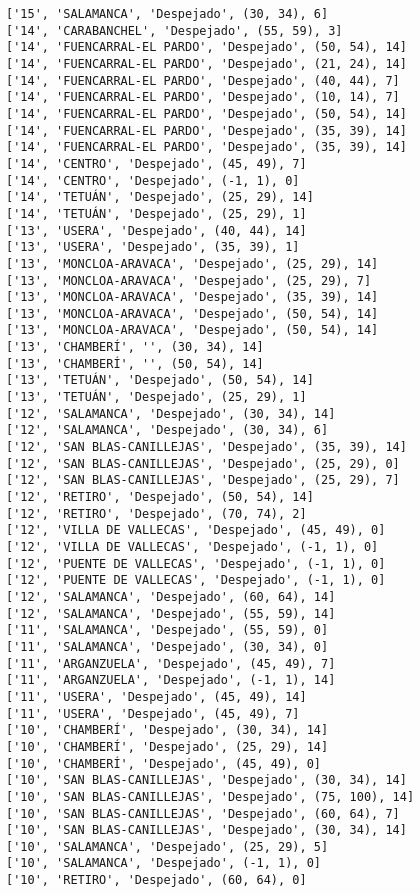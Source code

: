 \documentclass[11pt]{article}
\begin{document}
\begin{Verbatim}[commandchars=\\\{\}]
['15', 'SALAMANCA', 'Despejado', (30, 34), 6]
['14', 'CARABANCHEL', 'Despejado', (55, 59), 3]
['14', 'FUENCARRAL-EL PARDO', 'Despejado', (50, 54), 14]
['14', 'FUENCARRAL-EL PARDO', 'Despejado', (21, 24), 14]
['14', 'FUENCARRAL-EL PARDO', 'Despejado', (40, 44), 7]
['14', 'FUENCARRAL-EL PARDO', 'Despejado', (10, 14), 7]
['14', 'FUENCARRAL-EL PARDO', 'Despejado', (50, 54), 14]
['14', 'FUENCARRAL-EL PARDO', 'Despejado', (35, 39), 14]
['14', 'FUENCARRAL-EL PARDO', 'Despejado', (35, 39), 14]
['14', 'CENTRO', 'Despejado', (45, 49), 7]
['14', 'CENTRO', 'Despejado', (-1, 1), 0]
['14', 'TETUÁN', 'Despejado', (25, 29), 14]
['14', 'TETUÁN', 'Despejado', (25, 29), 1]
['13', 'USERA', 'Despejado', (40, 44), 14]
['13', 'USERA', 'Despejado', (35, 39), 1]
['13', 'MONCLOA-ARAVACA', 'Despejado', (25, 29), 14]
['13', 'MONCLOA-ARAVACA', 'Despejado', (25, 29), 7]
['13', 'MONCLOA-ARAVACA', 'Despejado', (35, 39), 14]
['13', 'MONCLOA-ARAVACA', 'Despejado', (50, 54), 14]
['13', 'MONCLOA-ARAVACA', 'Despejado', (50, 54), 14]
['13', 'CHAMBERÍ', '', (30, 34), 14]
['13', 'CHAMBERÍ', '', (50, 54), 14]
['13', 'TETUÁN', 'Despejado', (50, 54), 14]
['13', 'TETUÁN', 'Despejado', (25, 29), 1]
['12', 'SALAMANCA', 'Despejado', (30, 34), 14]
['12', 'SALAMANCA', 'Despejado', (30, 34), 6]
['12', 'SAN BLAS-CANILLEJAS', 'Despejado', (35, 39), 14]
['12', 'SAN BLAS-CANILLEJAS', 'Despejado', (25, 29), 0]
['12', 'SAN BLAS-CANILLEJAS', 'Despejado', (25, 29), 7]
['12', 'RETIRO', 'Despejado', (50, 54), 14]
['12', 'RETIRO', 'Despejado', (70, 74), 2]
['12', 'VILLA DE VALLECAS', 'Despejado', (45, 49), 0]
['12', 'VILLA DE VALLECAS', 'Despejado', (-1, 1), 0]
['12', 'PUENTE DE VALLECAS', 'Despejado', (-1, 1), 0]
['12', 'PUENTE DE VALLECAS', 'Despejado', (-1, 1), 0]
['12', 'SALAMANCA', 'Despejado', (60, 64), 14]
['12', 'SALAMANCA', 'Despejado', (55, 59), 14]
['11', 'SALAMANCA', 'Despejado', (55, 59), 0]
['11', 'SALAMANCA', 'Despejado', (30, 34), 0]
['11', 'ARGANZUELA', 'Despejado', (45, 49), 7]
['11', 'ARGANZUELA', 'Despejado', (-1, 1), 14]
['11', 'USERA', 'Despejado', (45, 49), 14]
['11', 'USERA', 'Despejado', (45, 49), 7]
['10', 'CHAMBERÍ', 'Despejado', (30, 34), 14]
['10', 'CHAMBERÍ', 'Despejado', (25, 29), 14]
['10', 'CHAMBERÍ', 'Despejado', (45, 49), 0]
['10', 'SAN BLAS-CANILLEJAS', 'Despejado', (30, 34), 14]
['10', 'SAN BLAS-CANILLEJAS', 'Despejado', (75, 100), 14]
['10', 'SAN BLAS-CANILLEJAS', 'Despejado', (60, 64), 7]
['10', 'SAN BLAS-CANILLEJAS', 'Despejado', (30, 34), 14]
['10', 'SALAMANCA', 'Despejado', (25, 29), 5]
['10', 'SALAMANCA', 'Despejado', (-1, 1), 0]
['10', 'RETIRO', 'Despejado', (60, 64), 0]

\end{Verbatim}
\end{document}
